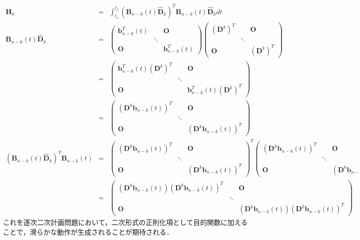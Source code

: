 \begin{eqnarray}
  \bm{H}_k
  &=& \int_{t_s}^{t_f} \left( \bm{B}_{n-k}(t) \bm{\hat{D}}_k \right)^T \bm{B}_{n-k}(t) \bm{\hat{D}}_k dt \\
  \bm{B}_{n-k}(t) \bm{\hat{D}}_k
  &=& \begin{pmatrix} \bm{b}_{n-k}^T(t) && \bm{O} \\ &\ddots& \\ \bm{O} && \bm{b}_{n-k}^T(t) \end{pmatrix} \begin{pmatrix} (\bm{D}^k)^T && \bm{O} \\ &\ddots& \\ \bm{O} && (\bm{D}^k)^T \end{pmatrix} \\
  &=& \begin{pmatrix} \bm{b}_{n-k}^T(t) (\bm{D}^k)^T && \bm{O} \\ &\ddots& \\ \bm{O} && \bm{b}_{n-k}^T(t) (\bm{D}^k)^T \end{pmatrix} \\
  &=& \begin{pmatrix} \left( \bm{D}^k \bm{b}_{n-k}(t) \right)^T && \bm{O} \\ &\ddots& \\ \bm{O} && \left( \bm{D}^k \bm{b}_{n-k}(t) \right)^T \end{pmatrix} \\
  \left( \bm{B}_{n-k}(t) \bm{\hat{D}}_k \right)^T \bm{B}_{n-k}(t)
  &=& \begin{pmatrix} \left( \bm{D}^k \bm{b}_{n-k}(t) \right)^T && \bm{O} \\ &\ddots& \\ \bm{O} && \left( \bm{D}^k \bm{b}_{n-k}(t) \right)^T \end{pmatrix}^T \begin{pmatrix} \left( \bm{D}^k \bm{b}_{n-k}(t) \right)^T && \bm{O} \\ &\ddots& \\ \bm{O} && \left( \bm{D}^k \bm{b}_{n-k}(t) \right)^T \end{pmatrix} \\
  &=& \begin{pmatrix} \left( \bm{D}^k \bm{b}_{n-k}(t) \right) \left( \bm{D}^k \bm{b}_{n-k}(t) \right)^T && \bm{O} \\ &\ddots& \\ \bm{O} && \left( \bm{D}^k \bm{b}_{n-k}(t) \right) \left( \bm{D}^k \bm{b}_{n-k}(t) \right)^T \end{pmatrix}
\end{eqnarray}
これを逐次二次計画問題において，二次形式の正則化項として目的関数に加えることで，滑らかな動作が生成されることが期待される．

